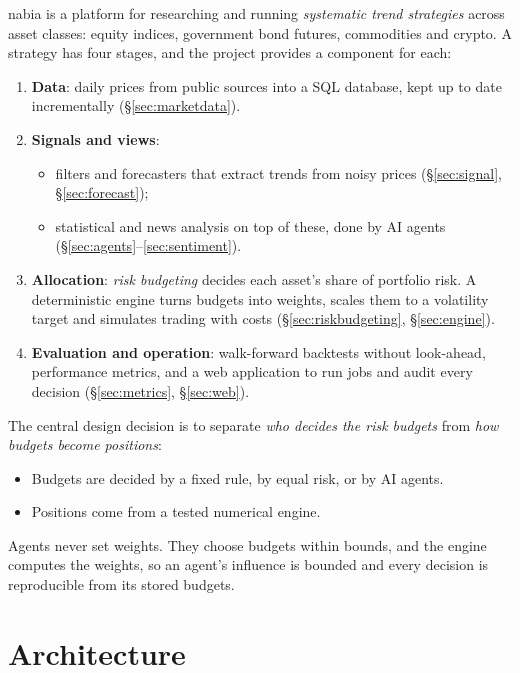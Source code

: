 \documentclass[11pt,a4paper]{article}
\begin{document}
nabia is a platform for researching and running \emph{systematic trend strategies} across
asset classes: equity indices, government bond futures, commodities and crypto. A strategy
has four stages, and the project provides a component for each:
\begin{enumerate}
  \item \textbf{Data}: daily prices from public sources into a SQL database, kept up to
        date incrementally (\S\ref{sec:marketdata}).
  \item \textbf{Signals and views}:
        \begin{itemize}
          \item filters and forecasters that extract trends from noisy prices
                (\S\ref{sec:signal}, \S\ref{sec:forecast});
          \item statistical and news analysis on top of these, done by AI agents
                (\S\ref{sec:agents}--\ref{sec:sentiment}).
        \end{itemize}
  \item \textbf{Allocation}: \emph{risk budgeting} decides each asset's share of portfolio
        risk. A deterministic engine turns budgets into weights, scales them to a volatility
        target and simulates trading with costs (\S\ref{sec:riskbudgeting}, \S\ref{sec:engine}).
  \item \textbf{Evaluation and operation}: walk-forward backtests without look-ahead,
        performance metrics, and a web application to run jobs and audit every decision
        (\S\ref{sec:metrics}, \S\ref{sec:web}).
\end{enumerate}

The central design decision is to separate \emph{who decides the risk budgets} from
\emph{how budgets become positions}:
\begin{itemize}
  \item Budgets are decided by a fixed rule, by equal risk, or by AI agents.
  \item Positions come from a tested numerical engine.
\end{itemize}
Agents never set weights. They choose budgets within bounds, and the engine computes the
weights, so an agent's influence is bounded and every decision is reproducible from its
stored budgets.

\section{Architecture}\label{sec:architecture}
\end{document}

